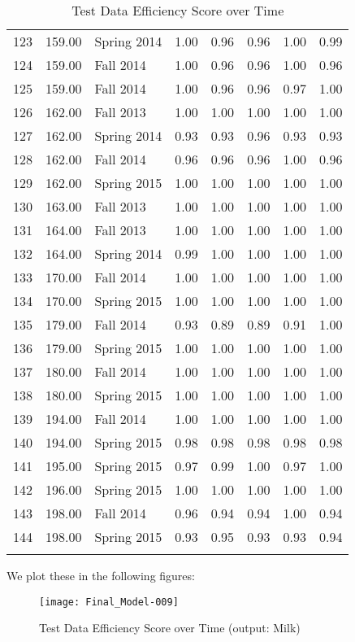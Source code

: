 \documentclass[12pt,]{article}
\begin{document}
\begin{longtable}{l|l|l|l|l|l|l|l}
  123 & 159.00 & Spring 2014 & 1.00 & 0.96 & 0.96 & 1.00 & 0.99 \\ 
  124 & 159.00 & Fall 2014 & 1.00 & 0.96 & 0.96 & 1.00 & 0.96 \\ 
  125 & 159.00 & Fall 2014 & 1.00 & 0.96 & 0.96 & 0.97 & 1.00 \\ 
  126 & 162.00 & Fall 2013 & 1.00 & 1.00 & 1.00 & 1.00 & 1.00 \\ 
  127 & 162.00 & Spring 2014 & 0.93 & 0.93 & 0.96 & 0.93 & 0.93 \\ 
  128 & 162.00 & Fall 2014 & 0.96 & 0.96 & 0.96 & 1.00 & 0.96 \\ 
  129 & 162.00 & Spring 2015 & 1.00 & 1.00 & 1.00 & 1.00 & 1.00 \\ 
  130 & 163.00 & Fall 2013 & 1.00 & 1.00 & 1.00 & 1.00 & 1.00 \\ 
  131 & 164.00 & Fall 2013 & 1.00 & 1.00 & 1.00 & 1.00 & 1.00 \\ 
  132 & 164.00 & Spring 2014 & 0.99 & 1.00 & 1.00 & 1.00 & 1.00 \\ 
  133 & 170.00 & Fall 2014 & 1.00 & 1.00 & 1.00 & 1.00 & 1.00 \\ 
  134 & 170.00 & Spring 2015 & 1.00 & 1.00 & 1.00 & 1.00 & 1.00 \\ 
  135 & 179.00 & Fall 2014 & 0.93 & 0.89 & 0.89 & 0.91 & 1.00 \\ 
  136 & 179.00 & Spring 2015 & 1.00 & 1.00 & 1.00 & 1.00 & 1.00 \\ 
  137 & 180.00 & Fall 2014 & 1.00 & 1.00 & 1.00 & 1.00 & 1.00 \\ 
  138 & 180.00 & Spring 2015 & 1.00 & 1.00 & 1.00 & 1.00 & 1.00 \\ 
  139 & 194.00 & Fall 2014 & 1.00 & 1.00 & 1.00 & 1.00 & 1.00 \\ 
  140 & 194.00 & Spring 2015 & 0.98 & 0.98 & 0.98 & 0.98 & 0.98 \\ 
  141 & 195.00 & Spring 2015 & 0.97 & 0.99 & 1.00 & 0.97 & 1.00 \\ 
  142 & 196.00 & Spring 2015 & 1.00 & 1.00 & 1.00 & 1.00 & 1.00 \\ 
  143 & 198.00 & Fall 2014 & 0.96 & 0.94 & 0.94 & 1.00 & 0.94 \\ 
  144 & 198.00 & Spring 2015 & 0.93 & 0.95 & 0.93 & 0.93 & 0.94 \\ 
   \hline
\hline
\caption{Test Data Efficiency Score over Time} 
\label{Table-3}
\end{longtable}

We plot these in the following figures:
\begin{figure}[H]
\texttt{[image: Final\_Model-009]}
\caption{Test Data Efficiency Score over Time (output: Milk)}
\end{figure}
\end{document}
